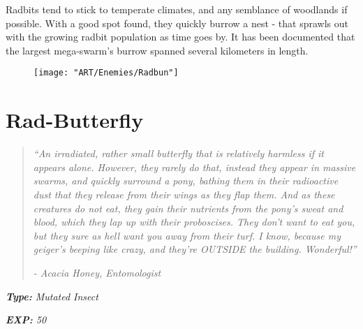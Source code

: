 \documentclass[11pt,a4paper,twocolumn]{book}
\begin{document}
	Radbits tend to stick to temperate climates, and any semblance of woodlands if possible. With a good spot found, they quickly burrow a nest - that sprawls out with the growing radbit population as time goes by. It has been documented that the largest mega-swarm's burrow spanned several kilometers in length.
	
	\begin{figure}[h]
		\centering
		\texttt{[image: "ART/Enemies/Radbun"]}
	\end{figure}
	
	\clearpage
	
	\section*{Rad-Butterfly}
	\begin{quote}
		\emph{``An irradiated, rather small butterfly that is relatively harmless if it appears alone. However, they rarely do that, instead they appear in massive swarms, and quickly surround a pony, bathing them in their radioactive dust that they release from their wings as they flap them. And as these creatures do not eat, they gain their nutrients from the pony's sweat and blood, which they lap up with their proboscises. They don't want to eat you, but they sure as hell want you away from their turf. I know, because my geiger's beeping like crazy, and they're OUTSIDE the building. Wonderful!''}
		
		\emph{-	Acacia Honey, Entomologist}
	\end{quote}
	
	\emph{\textbf{Type:} Mutated Insect}
	
	\emph{\textbf{EXP:} 50}
	
%		
%	
%		
\end{document}
